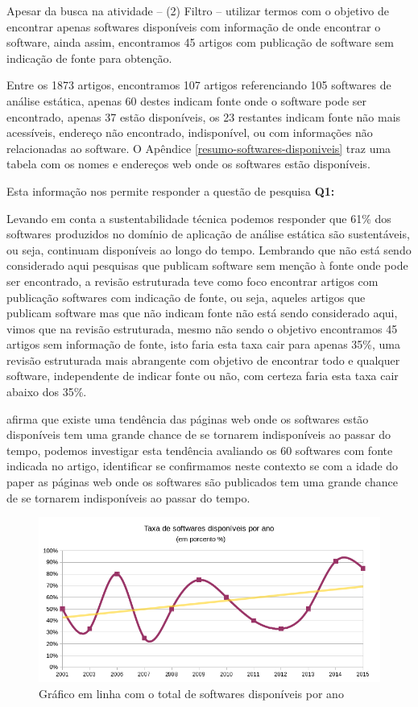 Apesar da busca na atividade -- (2) Filtro -- utilizar termos com o objetivo de
encontrar apenas softwares disponíveis com informação de onde encontrar o
software, ainda assim, encontramos 45 artigos com publicação de software sem
indicação de fonte para obtenção.

Entre os 1873 artigos, encontramos 107 artigos referenciando 105 softwares de
análise estática, apenas 60 destes indicam fonte onde o software pode ser
encontrado, apenas 37 estão disponíveis, os 23 restantes indicam fonte não mais
acessíveis, endereço não encontrado, indisponível, ou com informações não
relacionadas ao software. O Apêndice \ref{resumo-softwares-disponiveis} traz
uma tabela com os nomes e endereços web onde os softwares estão disponíveis.

Esta informação nos permite responder a questão de pesquisa {\bf Q1:}
\QuestaoUm

Levando em conta a sustentabilidade técnica podemos responder que 61\% dos
softwares produzidos no domínio de aplicação de análise estática são
sustentáveis, ou seja, continuam disponíveis ao longo do tempo. Lembrando que
não está sendo considerado aqui pesquisas que publicam software sem menção à
fonte onde pode ser encontrado, a revisão estruturada teve como foco encontrar
artigos com publicação softwares com indicação de fonte, ou seja, aqueles
artigos que publicam software mas que não indicam fonte não está sendo
considerado aqui, vimos que na revisão estruturada, mesmo não sendo o objetivo
encontramos 45 artigos sem informação de fonte, isto faria esta taxa cair para
apenas 35\%, uma revisão estruturada mais abrangente com objetivo de encontrar
todo e qualquer software, independente de indicar fonte ou não, com certeza
faria esta taxa cair abaixo dos 35\%.

 afirma que existe uma tendência das páginas
web onde os softwares estão disponíveis tem uma grande chance de se tornarem
indisponíveis ao passar do tempo, podemos investigar esta tendência 
avaliando os 60 softwares com fonte indicada no artigo,
identificar se confirmamos neste contexto se com a idade do paper
as páginas web onde os softwares são publicados tem uma grande chance de se
tornarem indisponíveis ao passar do tempo.

\begin{figure}[h]
  \center
  \includegraphics[scale=0.65]{imagens/softwares-disponivel-por-ano.png}
  \caption{Gráfico em linha com o total de softwares disponíveis por ano}
  \label{softwares-disponivel-por-ano}
\end{figure}

